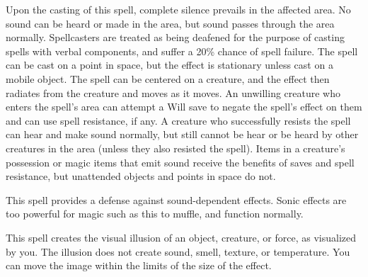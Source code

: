 \spellrng{\rngmed}
\begin{spelleffect}
  Upon the casting of this spell, complete silence prevails in the affected area. No sound can be heard or made in the area, but sound passes through the area normally. Spellcasters are treated as being deafened for the purpose of casting spells with verbal components, and suffer a 20\% chance of spell failure. The spell can be cast on a point in space, but the effect is stationary unless cast on a mobile object. The spell can be centered on a creature, and the effect then radiates from the creature and moves as it moves. An unwilling creature who enters the spell's area can attempt a Will save to negate the spell's effect on them and can use spell resistance, if any. A creature who successfully resists the spell can hear and make sound normally, but still cannot be hear or be heard by other creatures in the area (unless they also resisted the spell). Items in a creature's possession or magic items that emit sound receive the benefits of saves and spell resistance, but unattended objects and points in space do not. 
\end{spelleffect}
\begin{spellnotes}
  This spell provides a defense against sound-dependent effects. Sonic effects are too powerful for magic such as this to muffle, and function normally.
\end{spellnotes}

\spellrng{\rngmed}
\begin{spelleffect}
  This spell creates the visual illusion of an object, creature, or force, as visualized by you. The illusion does not create sound, smell, texture, or temperature. You can move the image within the limits of the size of the effect.
\end{spelleffect}

